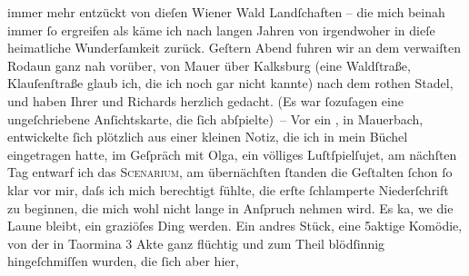 \begin{ledgroupsized}[t]{13cm}
               immer mehr entzückt von dieſen Wiener Wald
               Landſchaften – die mich beinah immer ſo ergreifen als käme ich nach langen Jahren von
               irgendwoher in dieſe heimatliche Wunderſamkeit zurück. Geſtern Abend fuhren wir an
               dem verwaiſten Ro{\pb}daun
               ganz nah vorüber, von Mauer über Kalksburg (eine Waldſtraße, Klauſenſtraße glaub ich, die ich noch gar nicht kannte) nach dem rothen Stadel, und haben Ihrer und Richards herzlich gedacht. (Es war ſozuſagen eine
               ungeſchriebene Anſichtskarte, die ſich abſpielte) –\pend
           \pstart
           Vor ein \label{K_L01422_2v}\label{K_L01422_2h}, in Mauerbach,
               entwickelte ſich plötzlich aus einer kleinen Notiz, die ich in mein Büchel
               eingetragen hatte, im Geſpräch mit Olga, ein
               völliges Luſtſpielſujet, am
               nächſten Tag ent{\pb}warf ich das \textsc{Scenarium}, am übernächſten ſtanden die Geſtalten ſchon ſo klar vor mir, daſs
               ich mich berechtigt fühlte, die erſte ſchlamperte Niederſchrift zu beginnen, die mich
               wohl nicht lange in Anſpruch nehmen wird. Es ka{\geminationn}, we{\geminationn} die Laune bleibt, ein graziöſes Ding werden. Ein
               andres Stück, eine 5aktige
                  Komödie, von der in Taormina 3 Akte ganz
               flüchtig und zum Theil blödſinnig hingeſchmiſſen wurden, die ſich aber hier,

\end{ledgroupsized}
